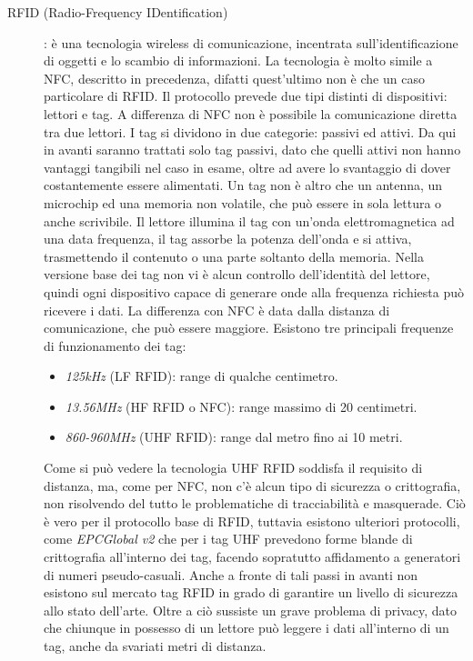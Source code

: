 \documentclass[a4paper,12pt]{report}
\begin{document}
\begin{description}
	\item[RFID (Radio-Frequency IDentification)]: è una tecnologia wireless di comunicazione, incentrata sull'identificazione di oggetti e lo scambio di informazioni. La tecnologia è molto simile a NFC, descritto in precedenza,  difatti quest'ultimo non è che un caso particolare di RFID. Il protocollo prevede due tipi distinti di dispositivi: lettori e tag. A differenza di NFC non è possibile la comunicazione diretta tra due lettori. I tag si dividono in due categorie: passivi ed attivi. Da qui in avanti saranno trattati solo tag passivi, dato che quelli attivi non hanno vantaggi tangibili nel caso in esame, oltre ad avere lo svantaggio di dover costantemente essere alimentati. Un tag non è altro che un antenna, un microchip ed una memoria non volatile, che può essere in sola lettura o anche scrivibile. Il lettore illumina il tag con un'onda elettromagnetica ad una data frequenza, il tag assorbe la potenza dell'onda e si attiva, trasmettendo il contenuto o una parte soltanto della memoria. Nella versione base dei tag non vi è alcun controllo dell'identità del lettore, quindi ogni dispositivo capace di generare onde alla frequenza richiesta può ricevere i dati. La differenza con NFC è data dalla distanza di comunicazione, che può essere maggiore. Esistono tre principali frequenze di funzionamento dei tag:
	\begin{itemize}
		\item \emph{125kHz} (LF RFID): range di qualche centimetro.
		\item \emph{13.56MHz} (HF RFID o NFC): range massimo di 20 centimetri.
		\item \emph{860-960MHz} (UHF RFID): range dal metro fino ai 10 metri.
	\end{itemize}
	Come si può vedere la tecnologia UHF RFID soddisfa il requisito di distanza, ma, come per NFC, non c'è alcun tipo di sicurezza o crittografia, non risolvendo del tutto le problematiche di tracciabilità e masquerade. Ciò è vero per il protocollo base di RFID, tuttavia esistono ulteriori protocolli, come \emph{EPCGlobal v2} che per i tag UHF prevedono forme blande di crittografia all'interno dei tag, facendo sopratutto affidamento a generatori di numeri pseudo-casuali. Anche a fronte di tali passi in avanti non esistono sul mercato tag RFID in grado di garantire un livello di sicurezza allo stato dell'arte. Oltre a ciò sussiste un grave problema di privacy, dato che chiunque in possesso di un lettore può leggere i dati all'interno di un tag, anche da svariati metri di distanza.
	

\end{description}
\end{document}
